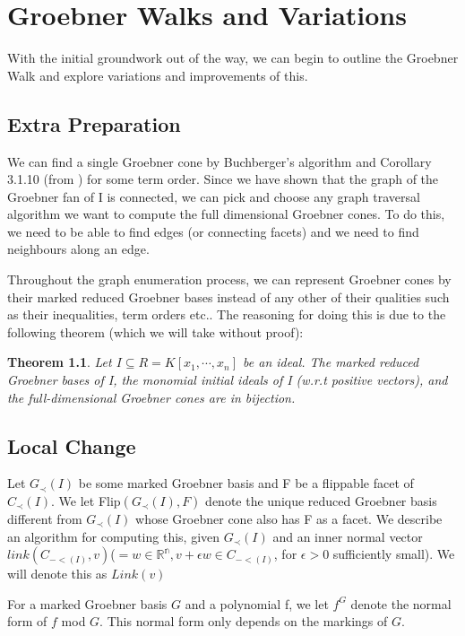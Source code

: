 \documentclass[12pt,a4paper]{report}
\newtheorem{theorem}{Theorem}[section]
\begin{document}
\chapter{Groebner Walks and Variations}
With the initial groundwork out of the way, we can begin to outline the Groebner Walk and explore variations and improvements of this. 

\section{Extra Preparation}
We can find a single Groebner cone by Buchberger's algorithm and Corollary 3.1.10 (from \cite{AndersPHD}) for some term order. Since we have shown that the graph of the Groebner fan of I is connected, we can pick and choose any graph traversal algorithm we want to compute the full dimensional Groebner cones. To do this, we need to be able to find edges (or connecting facets) and we need to find neighbours along an edge.

Throughout the graph enumeration process, we can represent Groebner cones by their marked reduced Groebner bases instead of any other of their qualities such as their inequalities, term orders etc.. The reasoning for doing this is due to the following theorem (which we will take without proof):

\begin{theorem}
Let $I \subseteq R = K[x_{1}, \cdots, x_{n}]$ be an ideal. The marked reduced Groebner bases of I, the monomial initial ideals of I (w.r.t positive vectors), and the full-dimensional Groebner cones are in bijection.
\end{theorem}

\section{Local Change}
Let $G_{\prec} (I)$ be some marked Groebner basis and F be a flippable facet of $C_{\prec} (I)$. We let Flip$(G_{\prec} (I), F)$ denote the unique reduced Groebner basis different from $G_{\prec} (I)$ whose Groebner cone also has F as a facet. We describe an algorithm for computing this, given $G_{\prec} (I)$ and an inner normal vector $link(C_{-< (I)}, v) $($ = w \in \mathbb{R^n}, v + \epsilon w \in C_{-< (I)}$, for $\epsilon > 0$ sufficiently small). We will denote this as $Link(v)$

For a marked Groebner basis $G$ and a polynomial f, we let $f^{G}$ denote the normal form of $f$ mod $G$. This normal form only depends on the markings of $G$.
\end{document}
